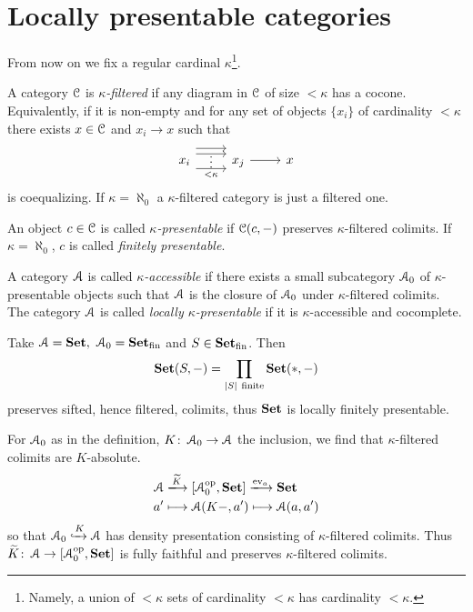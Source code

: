 \documentclass[a4paper,11pt,oneside,openany]{scrbook}
\begin{document}
\section{Locally presentable categories}
From now on we fix a regular cardinal $\kappa$\footnote{Namely, a union of $<\kappa$ sets of cardinality $<\kappa$ has cardinality $<\kappa$.}.
\begin{defn}
	A category $\operatorname{\mathcal{C}}$ is \emph{$\kappa$-filtered} if any diagram in $\operatorname{\mathcal{C}}$ of size $<\kappa$ has a cocone. Equivalently, if it is non-empty and for any set of objects $\{x_i\}$ of cardinality $<\kappa$ there exists $x\in\operatorname{\mathcal{C}}$ and $x_i\to x$ such that
	\[
		\begin{tikzcd}
			x_i\arrow[r,shift left=2.2ex] \arrow[r,shift left=1.2ex,""{name=A}] \arrow[r, shift right=1.5ex,"<\kappa"',""{name=B}]\ar[from=A, to=B, phantom, "\vdots"]&x_j \arrow[r]&x
		\end{tikzcd}
	\]
	is coequalizing. If $\kappa=\aleph_0$ a $\kappa$-filtered category is just a
    filtered one.
\end{defn}
\begin{defn}
	An object $c\in\operatorname{\mathcal{C}}$ is called \emph{$\kappa$-presentable} if $\operatorname{\mathcal{C}}(c,-)$
    preserves $\kappa$-filtered colimits. If $\kappa=\aleph_0$, $c$ is called
    \emph{finitely presentable}.
\end{defn}
\begin{defn}
	A category $\operatorname{\mathcal{A}}$ is called \emph{$\kappa$-accessible} if there exists a small
    subcategory $\operatorname{\mathcal{A}}_0$ of $\kappa$-presentable objects such that $\operatorname{\mathcal{A}}$ is the
    closure of $\operatorname{\mathcal{A}}_0$ under $\kappa$-filtered colimits. The category $\operatorname{\mathcal{A}}$ is
    called \emph{locally $\kappa$-presentable} if it is $\kappa$-accessible and
    cocomplete.
\end{defn}
\begin{exmp}
	Take $\A=\Set,\ \A_0=\Set_\text{fin}$ and $S\in{\normalfont\textbf{Set}}_\text{fin}$. Then $$\Set(S,-)=\displaystyle\prod_{|S| \ \text{finite}}\Set(*,-)$$
	preserves sifted, hence filtered, colimits, thus ${\normalfont\textbf{Set}}$ is locally finitely
    presentable.
\end{exmp}
\begin{rmk}
	For $\operatorname{\mathcal{A}}_0$ as in the definition, $K\colon\operatorname{\mathcal{A}}_0\to\operatorname{\mathcal{A}}$ the inclusion, we find that $\kappa$-filtered colimits are $K$-absolute.
	\begin{align*}
		\A & \xlongrightarrow{\widetilde{K}}\left[\A_0^{\op},\Set\right]\xlongrightarrow{\text{ev}_a}\Set \\
		a' & \longmapsto\A(K-,a')\longmapsto\A(a,a')
	\end{align*}
	so that $\operatorname{\mathcal{A}}_0\xhookrightarrow{K}\operatorname{\mathcal{A}}$ has density presentation consisting of $\kappa$-filtered colimits. Thus $\widetilde{K}\colon\operatorname{\mathcal{A}}\to\left[\operatorname{\mathcal{A}}_0^{\operatorname{\text{op}}},{\normalfont\textbf{Set}}\right]$ is fully faithful and preserves $\kappa$-filtered colimits.
\end{rmk}
\end{document}
